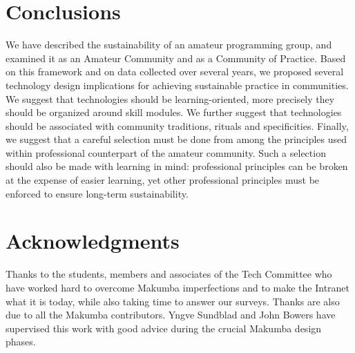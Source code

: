 \documentclass{sig-alt-release2}
\begin{document}
\section{Conclusions}\label{sec:conclusions}
We have described the sustainability of an amateur programming group, and examined it as an Amateur Community and as a Community of Practice. Based on this framework and on data collected over several years, we proposed several technology design implications for achieving sustainable practice in communities. We suggest that technologies should be learning-oriented, more precisely they should be organized around skill modules. We further suggest that technologies should be associated with community traditions, rituals and specificities. Finally, we suggest that a careful selection must be done from among the principles used within professional counterpart of the amateur community. Such a selection should also be made with learning in mind: professional principles can be broken at the expense of easier learning, yet other professional principles must be enforced to ensure long-term sustainability.

\section{Acknowledgments}\label{sec:acknowledgments}
Thanks to the students, members and associates of the Tech Committee who have worked hard to overcome Makumba imperfections and to make the Intranet what it is today, while also taking time to answer our surveys.  Thanks are also due to all the Makumba contributors.  Yngve Sundblad and John Bowers have supervised this work with good advice during the crucial Makumba design phases.


\end{document}
